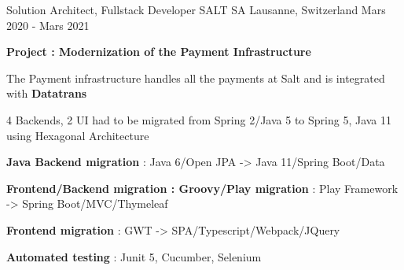 \clearpage


\begin{cventries}
        
        \cventry
        {Solution Architect, Fullstack Developer} %
        {SALT SA} %
        {Lausanne, Switzerland} %
        {Mars 2020 - Mars 2021} %
        {
            \begin{cvitems} %
                \item{\textbf{Project : Modernization of the Payment Infrastructure}}
                \item{The Payment infrastructure handles all the payments at Salt and is integrated with \textbf{Datatrans}}
                \item{4 Backends, 2 UI had to be migrated from Spring 2/Java 5 to Spring 5, Java 11 using Hexagonal Architecture}
                \item{\textbf{Java Backend migration} : Java 6/Open JPA -> Java 11/Spring Boot/Data}
                \item{\textbf{Frontend/Backend migration : Groovy/Play migration} : Play Framework -> Spring Boot/MVC/Thymeleaf}
                \item{\textbf{Frontend migration} : GWT -> SPA/Typescript/Webpack/JQuery}
                \item{\textbf{Automated testing} : Junit 5, Cucumber, Selenium}
            \end{cvitems}
        }


\end{cventries}
